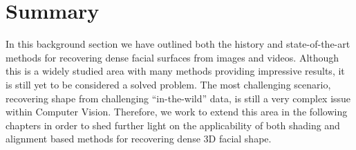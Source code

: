 \section{Summary}\label{sec:bg_summary}
In this background section we have outlined both the history and state-of-the-art
methods for recovering dense facial surfaces from images and videos. Although
this is a widely studied area with many methods providing impressive results,
it is still yet to be considered a solved problem. The most challenging scenario,
recovering shape from challenging ``in-the-wild'' data, is still
a very complex issue within Computer Vision. Therefore, we work to extend
this area in the following chapters in order to shed further light on the
applicability of both shading and alignment based methods for recovering
dense 3D facial shape.